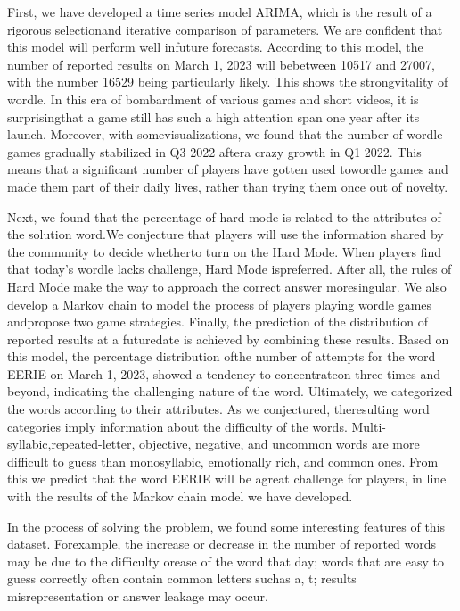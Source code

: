 \documentclass[12pt]{article}  %
\begin{document}
 \noindent First, we have developed a time series model ARIMA, which is the result of a rigorous selectionand iterative comparison of parameters. We are confident that this model will perform well infuture forecasts. According to this model, the number of reported results on March 1, 2023 will bebetween 10517 and 27007, with the number 16529 being particularly likely. This shows the strongvitality of wordle. In this era of bombardment of various games and short videos, it is surprisingthat a game still has such a high attention span one year after its launch. Moreover, with somevisualizations, we found that the number of wordle games gradually stabilized in Q3 2022 aftera crazy growth in Q1 2022. This means that a significant number of players have gotten used towordle games and made them part of their daily lives, rather than trying them once out of novelty.
 
 \noindent Next, we found that the percentage of hard mode is related to the attributes of the solution word.We conjecture that players will use the information shared by the community to decide whetherto turn on the Hard Mode. When players find that today’s wordle lacks challenge, Hard Mode ispreferred. After all, the rules of Hard Mode make the way to approach the correct answer moresingular.
 We also develop a Markov chain to model the process of players playing wordle games andpropose two game strategies. Finally, the prediction of the distribution of reported results at a futuredate is achieved by combining these results. Based on this model, the percentage distribution ofthe number of attempts for the word EERIE on March 1, 2023, showed a tendency to concentrateon three times and beyond, indicating the challenging nature of the word.
 \noindent Ultimately, we categorized the words according to their attributes. As we conjectured, theresulting word categories imply information about the difficulty of the words. Multi-syllabic,repeated-letter, objective, negative, and uncommon words are more difficult to guess than monosyllabic, emotionally rich, and common ones. From this we predict that the word EERIE will be agreat challenge for players, in line with the results of the Markov chain model we have developed.
 
 \noindent In the process of solving the problem, we found some interesting features of this dataset. Forexample, the increase or decrease in the number of reported words may be due to the difficulty orease of the word that day; words that are easy to guess correctly often contain common letters suchas a, t; results misrepresentation or answer leakage may occur.
 
\end{document}
